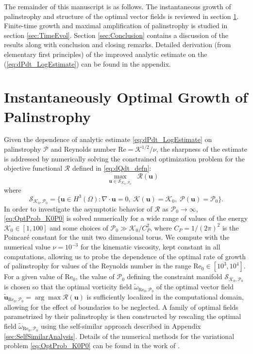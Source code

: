 \documentclass[11pt]{article}
\def\P{{\mathcal{P}}}
\def\R{{\mathcal{R}}}
\def\K{{\mathcal{K}}}
\newcommand{\uvec}{\mathbf{u}}
\newcommand{\Reyn}{\textrm{Re}}
\newcommand{\tuvecRP}{\widetilde{\mathbf{u}}_{\Reyn_0,\P_0}}
\newcommand{\twRP}{\widetilde{\omega}_{\Reyn_0,\P_0}}
\begin{document}
The remainder of this manuscript is as follows. The instantaneous growth of palinstrophy and structure of the optimal vector fields is reviewed in section \ref{sec:2D_InstOpt}. Finite-time growth and maximal amplification of palinstrophy is studied in section \ref{sec:TimeEvol}. Section \ref{sec:Conclusion} contains a discussion of the results along with conclusion and closing remarks. Detailed derivation (from elementary first principles) of the improved analytic estimate on the (\ref{eq:dPdt_LogEstimate}) can be found in the appendix. 

\section{Instantaneously Optimal Growth of Palinstrophy} 
\label{sec:2D_InstOpt}

Given the dependence of analytic estimate \eqref{eq:dPdt_LogEstimate} on palinstrophy $\P$ and Reynolds number $\textrm{Re} = \K^{1/2}/\nu$, the sharpness of the estimate is addressed by numerically solving the constrained optimization problem for the objective functional $\R$ defined in \eqref{eq:dQdt_defn}:
\begin{equation}\label{eq:OptProb_K0P0}
\qquad\mathop{\max}_{\uvec\in\mathcal{S}_{\K_0,\P_0}} \;\; \R(\uvec)
\end{equation}
where
\begin{equation}
\mathcal{S}_{\K_0,\P_0} = \{ \uvec\in H^3(\Omega) : \nabla\cdot\uvec = 0, \;  \K(\uvec) = \K_0, \; \P(\uvec) = \P_0 \}.
\end{equation}
In order to investigate the asymptotic behavior of $\R$ as $\P_0\to\infty$, \eqref{eq:OptProb_K0P0} is solved numerically for a wide range of values of the energy $\K_0 \in [1,100]$ and some choices of $\P_0 \gg \K_0/C_P^2$, where $C_P = 1/(2\pi)^2$ is the Poincar\'e constant for the unit two dimensional torus. We compute with the numerical value $\nu = 10^{-3}$ for the kinematic viscosity, kept constant in all computations, allowing us to probe the dependence of the optimal rate of growth of palinstrophy for values of the Reynolds number in the range $\Reyn_0 \in [10^3,10^4]$. For a given value of $\Reyn_0$, the value of $\P_0$ defining the constraint manifold $\mathcal{S}_{\K_0,\P_0}$ is chosen so that the optimal vorticity field $\twRP$ of the optimal vector field $\tuvecRP = \arg\max \R(\uvec)$ is sufficiently localized in the computational domain, allowing for the effect of boundaries to be neglected.
A family of optimal fields parametrized by their palinstrophy is then constructed by rescaling the optimal field $\twRP$ using the self-similar approach described in Appendix \ref{sec:SelfSimilarAnalysis}.
Details of the numerical methods for the variational problem \eqref{eq:OptProb_K0P0} can be found in the work of \cite{ap13a}. 
\end{document}
